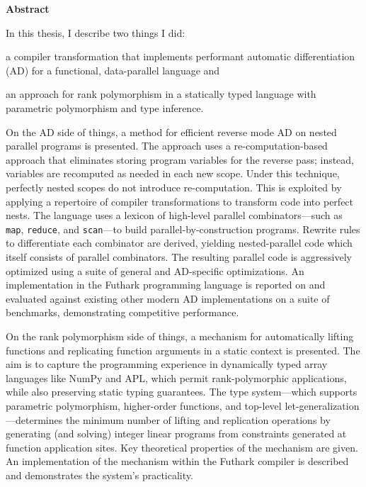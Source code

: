 
\begin{center}
\textbf{Abstract}
\end{center}
In this thesis, I describe two things I did:
\begin{enumerate*}[label=\arabic*)]
\item a compiler transformation that
implements performant automatic differentiation (AD) for a functional,
data-parallel language and
\item an approach for rank polymorphism in a statically typed language with
  parametric polymorphism and type inference.
\end{enumerate*}

On the AD side of things, a method for efficient reverse mode AD on nested
parallel programs is presented. The approach uses a re-computation-based approach
that eliminates storing program variables for the reverse pass; instead,
variables are recomputed as needed in each new scope. Under this technique,
perfectly nested scopes do not introduce re-computation. This is exploited by
applying a repertoire of compiler transformations to transform code into perfect
nests.
%
The language uses a lexicon of high-level parallel combinators---such as
\texttt{map}, \texttt{reduce}, and \texttt{scan}---to build
parallel-by-construction programs. Rewrite rules to differentiate each
combinator are derived, yielding nested-parallel code which itself consists of
parallel combinators. The resulting parallel code is aggressively optimized
using a suite of general and AD-specific optimizations.
%
An implementation in the Futhark programming language is reported on and
evaluated against existing other modern AD implementations on a suite of
benchmarks, demonstrating competitive performance.

On the rank polymorphism side of things, a mechanism for automatically lifting
functions and replicating function arguments in a static context is
presented. The aim is to capture the programming experience in dynamically typed
array languages like NumPy and APL, which permit rank-polymorphic applications,
while also preserving static typing guarantees. The type system---which supports
parametric polymorphism, higher-order functions, and top-level
let-generalization---determines the minimum number of lifting and replication
operations by generating (and solving) integer linear programs from constraints
generated at function application sites. Key theoretical properties of the
mechanism are given. An implementation of the mechanism within the Futhark
compiler is described and demonstrates the system's practicality.

